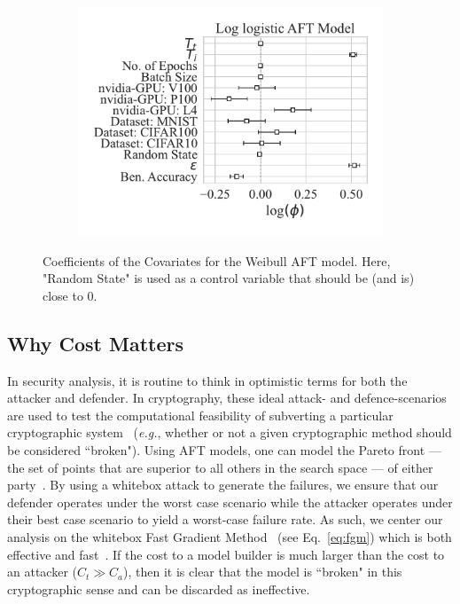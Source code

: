 \documentclass[conference]{IEEEtran}
\begin{document}
\begin{figure}[h!]
\begin{subfigure}{.3\textwidth}
        \includegraphics[width=\textwidth]{plots/combined/log_logistic_aft.pdf}
    \end{subfigure}
    \caption{Coefficients of the Covariates for the Weibull AFT model. Here, "Random State" is used as a control variable that should be (and is) close to 0.}
    \label{fig:aft}
\end{figure}

\subsection{Why Cost Matters}

In security analysis, it is  routine to think in optimistic terms for both the attacker and defender. 
In cryptography, these ideal attack- and defence-scenarios are used to test the computational feasibility of subverting a particular cryptographic system~\cite{kamal2017study,leurent2020sha} (\textit{e.g.}, whether or not a given cryptographic method should be considered ``broken"). 
Using AFT models, one can model the Pareto front --- the set of points that are superior to all others in the search space --- of either party~\cite{zitzler2008quality}. 
By using a whitebox attack to generate the failures, we ensure that our defender operates under the worst case scenario while the attacker operates under their best case scenario to yield a worst-case failure rate.
As such, we center our analysis on the whitebox Fast Gradient Method~\cite{fgm} (see Eq.~\ref{eq:fgm}) which is both effective and fast~\cite{meyers}. 
If the cost to a model builder is much larger than the cost to an attacker ($C_t \gg C_a$), then it is  clear that the model is ``broken" in this cryptographic sense and can be discarded as ineffective. 
\end{document}

